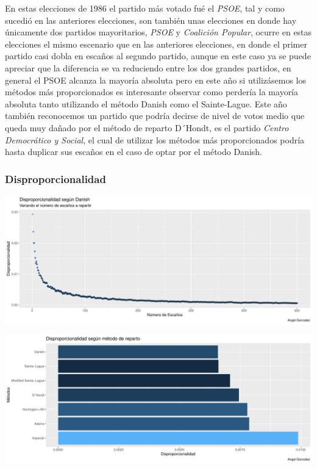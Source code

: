 \documentclass[12pt,a4paper,]{book}
\numberwithin{dummy}{section}
\theoremstyle{ocrenumbox}
\theoremstyle{blacknumex}
\theoremstyle{blacknumbox}
\theoremstyle{ocrenum}
\theoremstyle{ocrenum}
\begin{document}
En estas elecciones de 1986 el partido más votado fué el \emph{PSOE},
tal y como sucedió en las anteriores elecciones, son también unas
elecciones en donde hay únicamente dos partidos mayoritarios,
\emph{PSOE} y \emph{Coalición Popular}, ocurre en estas elecciones el
mismo escenario que en las anteriores elecciones, en donde el primer
partido casi dobla en escaños al segundo partido, aunque en este caso ya
se puede apreciar que la diferencia se va reduciendo entre los dos
grandes partidos, en general el PSOE alcanza la mayoría absoluta pero en
este año si utilizásemos los métodos más proporcionados es interesante
observar como perdería la mayoría absoluta tanto utilizando el método
Danish como el Sainte-Lague. Este año también reconocemos un partido que
podría decirse de nivel de votos medio que queda muy dañado por el
método de reparto D´Hondt, es el partido \emph{Centro Democrático y
Social}, el cual de utilizar los métodos más proporcionados podría hasta
duplicar sus escaños en el caso de optar por el método Danish.

\hypertarget{disproporcionalidad-3}{%
\subsubsection{Disproporcionalidad}\label{disproporcionalidad-3}}

\begin{center}\includegraphics[width=0.95\linewidth]{figurasR/unnamed-chunk-39-1} \end{center}

\begin{center}\includegraphics[width=0.95\linewidth]{figurasR/unnamed-chunk-39-2} \end{center}
\end{document}
